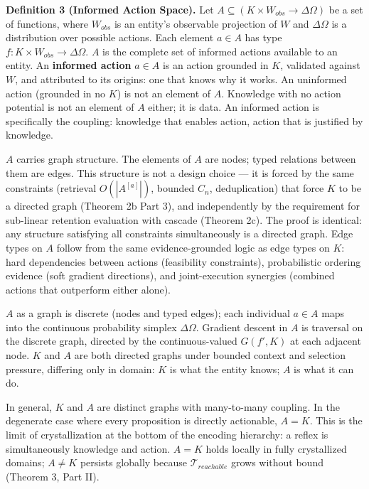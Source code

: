 \documentclass[
]{article}
\begin{document}
\textbf{Definition 3 (Informed Action Space).} Let
\(A \subseteq (K \times W_{obs} \to \Delta \Omega)\) be a set of functions,
where \(W_{obs}\) is an entity's observable projection of \(W\) and
\(\Delta \Omega\) is a distribution over possible actions. Each element
\(a \in A\) has type \(f : K \times W_{obs} \to \Delta \Omega\). \(A\) is the
complete set of informed actions available to an entity. An
\textbf{informed action} \(a \in A\) is an action grounded in \(K\),
validated against \(W\), and attributed to its origins: one that knows
why it works. An uninformed action (grounded in no \(K\)) is not an
element of \(A\). Knowledge with no action potential is not an element
of \(A\) either; it is data. An informed action is specifically the
coupling: knowledge that enables action, action that is justified by
knowledge.

\(A\) carries graph structure. The elements of \(A\) are nodes; typed
relations between them are edges. This structure is not a design choice
--- it is forced by the same constraints (retrieval
\(O(|A^{[a]}|)\), bounded \(C_n\), deduplication) that force \(K\) to be
a directed graph (Theorem 2b Part 3), and independently by the
requirement for sub-linear retention evaluation with cascade (Theorem
2c). The proof is identical: any structure satisfying all constraints
simultaneously is a directed graph. Edge
types on \(A\) follow from the same evidence-grounded logic as edge
types on \(K\): hard dependencies between actions (feasibility
constraints), probabilistic ordering evidence (soft gradient
directions), and joint-execution synergies (combined actions that
outperform either alone).

\(A\) as a graph is discrete (nodes and typed edges); each individual
\(a \in A\) maps into the continuous probability simplex \(\Delta \Omega\).
Gradient descent in \(A\) is traversal on the discrete graph, directed
by the continuous-valued \(G(f', K)\) at each adjacent node. \(K\) and
\(A\) are both directed graphs under bounded context and selection
pressure, differing only in domain: \(K\) is what the entity knows;
\(A\) is what it can do.

In general, \(K\) and \(A\) are distinct graphs with many-to-many
coupling. In the degenerate case where every proposition is directly
actionable, \(A = K\). This is the limit of crystallization at the
bottom of the encoding hierarchy: a reflex is simultaneously knowledge
and action. \(A = K\) holds locally in fully crystallized domains;
\(A \neq K\) persists globally because \(\mathcal{T}_{reachable}\) grows
without bound (Theorem 3, Part II).
\end{document}
